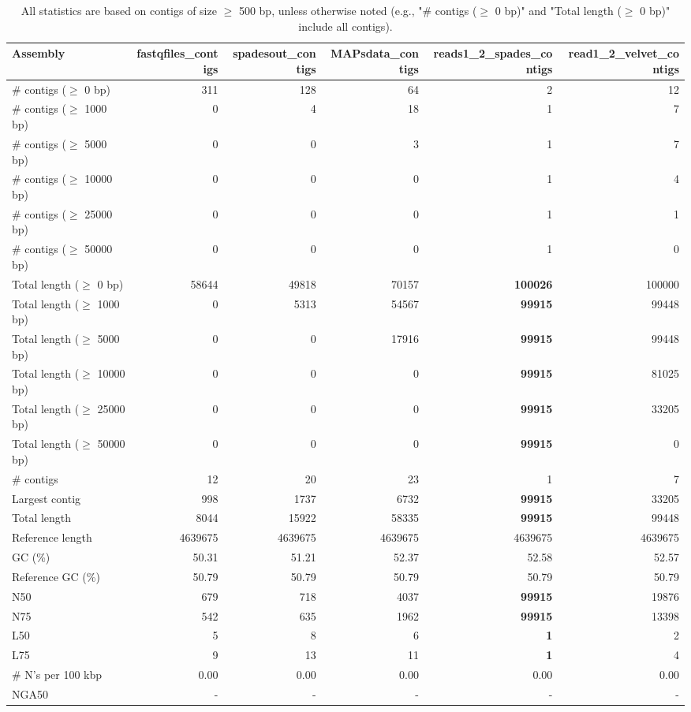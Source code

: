 \documentclass[12pt,a4paper]{article}
\begin{document}
\begin{table}[ht]
\begin{center}
\caption{All statistics are based on contigs of size $\geq$ 500 bp, unless otherwise noted (e.g., "\# contigs ($\geq$ 0 bp)" and "Total length ($\geq$ 0 bp)" include all contigs).}
\begin{tabular}{|l*{5}{|r}|}
\hline
Assembly & fastqfiles\_contigs & spadesout\_contigs & MAPsdata\_contigs & reads1\_2\_spades\_contigs & read1\_2\_velvet\_contigs \\ \hline
\# contigs ($\geq$ 0 bp) & 311 & 128 & 64 & 2 & 12 \\ \hline
\# contigs ($\geq$ 1000 bp) & 0 & 4 & 18 & 1 & 7 \\ \hline
\# contigs ($\geq$ 5000 bp) & 0 & 0 & 3 & 1 & 7 \\ \hline
\# contigs ($\geq$ 10000 bp) & 0 & 0 & 0 & 1 & 4 \\ \hline
\# contigs ($\geq$ 25000 bp) & 0 & 0 & 0 & 1 & 1 \\ \hline
\# contigs ($\geq$ 50000 bp) & 0 & 0 & 0 & 1 & 0 \\ \hline
Total length ($\geq$ 0 bp) & 58644 & 49818 & 70157 & {\bf 100026} & 100000 \\ \hline
Total length ($\geq$ 1000 bp) & 0 & 5313 & 54567 & {\bf 99915} & 99448 \\ \hline
Total length ($\geq$ 5000 bp) & 0 & 0 & 17916 & {\bf 99915} & 99448 \\ \hline
Total length ($\geq$ 10000 bp) & 0 & 0 & 0 & {\bf 99915} & 81025 \\ \hline
Total length ($\geq$ 25000 bp) & 0 & 0 & 0 & {\bf 99915} & 33205 \\ \hline
Total length ($\geq$ 50000 bp) & 0 & 0 & 0 & {\bf 99915} & 0 \\ \hline
\# contigs & 12 & 20 & 23 & 1 & 7 \\ \hline
Largest contig & 998 & 1737 & 6732 & {\bf 99915} & 33205 \\ \hline
Total length & 8044 & 15922 & 58335 & {\bf 99915} & 99448 \\ \hline
Reference length & 4639675 & 4639675 & 4639675 & 4639675 & 4639675 \\ \hline
GC (\%) & 50.31 & 51.21 & 52.37 & 52.58 & 52.57 \\ \hline
Reference GC (\%) & 50.79 & 50.79 & 50.79 & 50.79 & 50.79 \\ \hline
N50 & 679 & 718 & 4037 & {\bf 99915} & 19876 \\ \hline
N75 & 542 & 635 & 1962 & {\bf 99915} & 13398 \\ \hline
L50 & 5 & 8 & 6 & {\bf 1} & 2 \\ \hline
L75 & 9 & 13 & 11 & {\bf 1} & 4 \\ \hline
\# N's per 100 kbp & 0.00 & 0.00 & 0.00 & 0.00 & 0.00 \\ \hline
NGA50 & - & - & - & - & - \\ \hline
\end{tabular}
\end{center}
\end{table}
\end{document}
